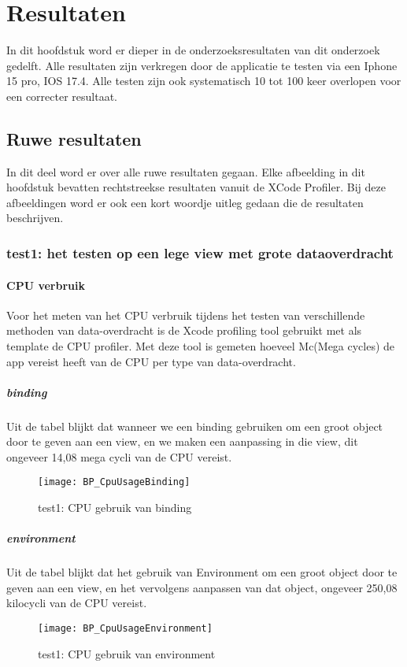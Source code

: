\chapter{Resultaten}%
In dit hoofdstuk word er dieper in de onderzoeksresultaten van dit onderzoek gedelft. Alle resultaten zijn verkregen door de applicatie te testen via een Iphone 15 pro, IOS 17.4. Alle testen zijn ook systematisch 10 tot 100 keer overlopen voor een correcter resultaat. 

\label{ch:resultaten}


\section{Ruwe resultaten}
In dit deel word er over alle ruwe resultaten gegaan. Elke afbeelding in dit hoofdstuk bevatten rechtstreekse resultaten vanuit de XCode Profiler. Bij deze afbeeldingen word er ook een kort woordje uitleg gedaan die de resultaten beschrijven.

\subsection{test1: het testen op een lege view met grote dataoverdracht}
\subsubsection{CPU verbruik}
Voor het meten van het CPU verbruik tijdens het testen van verschillende methoden van data-overdracht is de Xcode profiling tool gebruikt met als template de CPU profiler. Met deze tool is gemeten hoeveel Mc(Mega cycles) de app vereist heeft van de CPU per type van data-overdracht. 

\paragraph{binding}
Uit de tabel blijkt dat wanneer we een binding gebruiken om een groot object door te geven aan een view, en we maken een aanpassing in die view, dit ongeveer 14,08 mega cycli van de CPU vereist.
\begin{figure}[htbp]
    \centering
    \texttt{[image: BP\_CpuUsageBinding]} 
    \caption{test1: CPU gebruik van binding}
    \label{fig:cpuBinding}
\end{figure}

\paragraph{environment}
Uit de tabel blijkt dat het gebruik van Environment om een groot object door te geven aan een view, en het vervolgens aanpassen van dat object, ongeveer 250,08 kilocycli van de CPU vereist.
\begin{figure}[htbp]
    \centering
    \texttt{[image: BP\_CpuUsageEnvironment]} 
    \caption{test1: CPU gebruik van environment}
    \label{fig:cpuEnvironment}
\end{figure}


